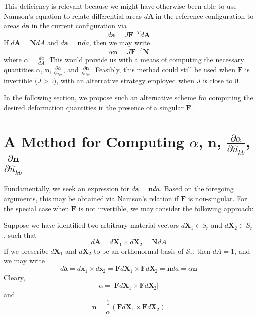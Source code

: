 \documentclass[11pt]{article} %
\begin{document}
This deficiency is relevant because we might have otherwise been able to use Namson's equation to relate differential areas $d \mathbf{A}$ in the reference configuration to areas $d \mathbf{a}$ in the current configuration via
\begin{equation}
	d \mathbf{a} = J \mathbf{F}^{-T} d \mathbf{A}
\end{equation}
If $d \mathbf{A} = \mathbf{N} dA$ and $d \mathbf{a} = \mathbf{n} da$, then we may write
\begin{equation}
	\alpha \mathbf{n} = J \mathbf{F}^{-T} \mathbf{N}
\end{equation}
where $\alpha = \frac{da}{dA}$. This would provide us with a means of computing the necessary quantities $\alpha$, $\mathbf{n}$, $\frac{\partial \alpha}{\partial \hat{u}_{kb}}$, and $\frac{\partial \mathbf{n}}{\partial \hat{u}_{kb}}$. Feasibly, this method could still be used when $\mathbf{F}$ is invertible ($J > 0$), with an alternative strategy employed when $J$ is close to $0$.

In the following section, we propose such an alternative scheme for computing the desired deformation quantities in the presence of a singular $\mathbf{F}$.

\section{A Method for Computing $\alpha$, $\mathbf{n}$, $\frac{\partial \alpha}{\partial \hat{u}_{kb}}$, $\frac{\partial \mathbf{n}}{\partial \hat{u}_{kb}}$}

Fundamentally, we seek an expression for $d \mathbf{a} = \mathbf{n} da$. Based on the foregoing arguments, this may be obtained via Namson's relation if $\mathbf{F}$ is non-singular. For the special case when $\mathbf{F}$ is not invertible, we may consider the following approach:

Suppose we have identified two arbitrary material vectors $d \mathbf{X}_1 \in S_r$ and $d \mathbf{X}_2 \in S_r$, such that
\begin{equation}
	d \mathbf{A} = d \mathbf{X}_1 \times d \mathbf{X}_2 = \mathbf{N} dA
\end{equation}
If we prescribe $d \mathbf{X}_1$ and $d \mathbf{X}_2$ to be an orthonormal basis of $\mathcal{S}_r$, then $dA = 1$, and we may write
\begin{equation}
	d \mathbf{a} = d \mathbf{x}_1 \times d \mathbf{x}_2 = \mathbf{F} d \mathbf{X}_1 \times \mathbf{F} d \mathbf{X}_2 = \mathbf{n} da = \alpha \mathbf{n}
\end{equation}
Cleary,
\begin{equation}
	\alpha = \left| \mathbf{F} d \mathbf{X}_1 \times \mathbf{F} d \mathbf{X}_2 \right|
\end{equation}
and
\begin{equation}
	\mathbf{n} = \frac{1}{\alpha} (\mathbf{F} d \mathbf{X}_1 \times \mathbf{F} d \mathbf{X}_2)
\end{equation}
\end{document}
